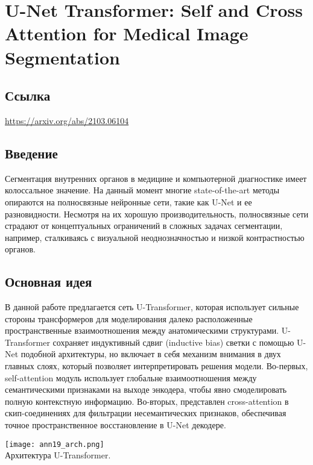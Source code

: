 \section{U-Net Transformer: Self and Cross Attention for
Medical Image Segmentation}

\subsection*{Ссылка} \url{https://arxiv.org/abs/2103.06104}
\subsection*{Введение}
Сегментация внутренних органов в медицине и компьютерной диагностике имеет 
колоссальное значение. На данный момент многие state-of-the-art методы 
опираются на полносвязные нейронные сети, такие как U-Net и ее разновидности. 
Несмотря на их хорошую производительность, полносвязные сети страдают от концептуальных 
ограничений в сложных задачах сегментации, например, сталкиваясь с визуальной 
неоднозначностью и низкой контрастностью органов.
\subsection*{Основная идея}
В данной работе предлагается сеть U-Transformer, которая использует 
сильные стороны трансформеров для моделирования далеко расположенные 
пространственные взаимоотношения между анатомическими структурами. U-Transformer 
сохраняет индуктивный сдвиг (inductive bias) светки с помощью U-Net подобной архитектуры, 
но включает в себя механизм внимания в двух главных слоях, который позволяет интерпретировать 
решения модели. Во-первых, self-attention модуль использует глобальне взаимоотношения между 
семантическими признаками на выходе энкодера, чтобы явно смоделировать полную контекстную информацию.
Во-вторых, представлен cross-attention в  скип-соединениях для фильтрации несемантических 
признаков, обеспечивая точное пространственное восстановление в U-Net декодере.
\\
\begin{minipage}{1.0\linewidth}
    \begin{center}
        \texttt{[image: ann19\_arch.png]} \\
        \caption{\scriptsize{
            Архитектура U-Transformer.
        }}
    \end{center}
    
\end{minipage} 

